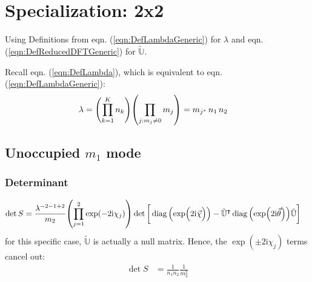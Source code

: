 \documentclass[
	english,
	a4paper,
	fontsize=10pt,
	parskip=half,
	titlepage=true,
	DIV=12,
	final
]{scrreprt}
\newcommand*{\transp}{\ensuremath{^\intercal}}
\newcommand*{\iunit}{\ensuremath{\mathrm{i}}}
\DeclareMathOperator{\diag}{diag}
\begin{document}
\section{Specialization: 2x2}
Using Definitions from eqn. (\ref{eqn:DefLambdaGeneric}) for $\lambda$ and eqn. (\ref{eqn:DefReducedDFTGeneric}) for $\tilde{\mathbb{U}}$.

Recall eqn. (\ref{eqn:DefLambda}), which is equivalent to eqn. (\ref{eqn:DefLambdaGeneric}):
\begin{align*}
	\lambda
&=
	\qty( \prod_{k=1}^{K}   n_k )
	\qty( \prod_{j : m_j \neq 0} m_j )
=
	m_{j^*} \, n_1 \, n_2
\end{align*}

\subsection{Unoccupied $m_1$ mode}
\subsubsection{Determinant}
\begin{align}
	\det S
&=
	\frac{ \lambda^{-2 - 1 + 2} }{ m_2 }
	\qty( \prod_{j=1}^{2} \exp(-2\iunit \chi_j) )
	\det\qty[\bigg.
		\diag\qty(\exp(\Big.2\iunit\vec{\chi}))
		-
		\tilde{\mathbb{U}}\transp
		\diag\qty(\exp(2\iunit\vec{\theta}))
		\tilde{\mathbb{U}}
	]
\end{align}
for this specific case, $\tilde{\mathbb{U}}$ is actually a null matrix. Hence, the 
$\exp(\pm 2\iunit \chi_j)$ terms cancel out:
\begin{align}
	\det S
&=
	\frac{1}{n_1 n_2}
	\frac{1}{m_2^{2}}
\end{align}
\end{document}
